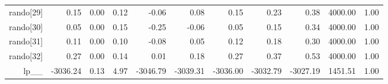 \begin{table}[ht]
\begin{tabular}{rrrrrrrrrrr}
  rando[29] & 0.15 & 0.00 & 0.12 & -0.06 & 0.08 & 0.15 & 0.23 & 0.38 & 4000.00 & 1.00 \\ 
  rando[30] & 0.05 & 0.00 & 0.15 & -0.25 & -0.06 & 0.05 & 0.15 & 0.34 & 4000.00 & 1.00 \\ 
  rando[31] & 0.11 & 0.00 & 0.10 & -0.08 & 0.05 & 0.12 & 0.18 & 0.30 & 4000.00 & 1.00 \\ 
  rando[32] & 0.27 & 0.00 & 0.14 & 0.01 & 0.18 & 0.27 & 0.37 & 0.53 & 4000.00 & 1.00 \\ 
  lp\_\_ & -3036.24 & 0.13 & 4.97 & -3046.79 & -3039.31 & -3036.00 & -3032.79 & -3027.19 & 1451.51 & 1.00 \\ 
   \hline
\end{tabular}
\label{efit_tab}
\end{table}
